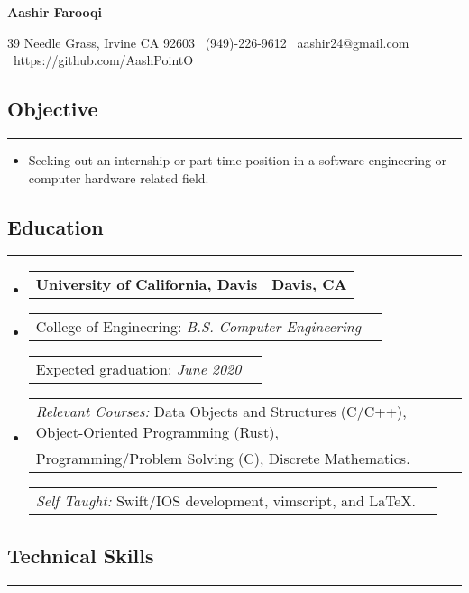 \documentclass[10pt,letterpaper]{article}
\makeatletter
\newcommand{\header}[2]
{
	\begin{tabular*}{\linewidth}{l@{\extracolsep{\fill}}r}
		#1 &
		#2 \\
	\end{tabular*}
}
\newcommand{\sectionbreak}
{
	\vspace{-1.2em}
	\rule{\textwidth}{1.7pt}
	\vspace{-1.7em}
}
\makeatother
\begin{document}
\begin{center}
{\LARGE \textbf{Aashir Farooqi}}

\vspace{0.5em}
39 Needle Grass, Irvine CA 92603 \textbar 
\ (949)-226-9612 \textbar 
\ aashir24@gmail.com \textbar
\ https://github.com/AashPointO 
\\
\end{center}
\vspace{-1.5em}

\subsection*{Objective}
\sectionbreak

\begin{itemize}
	\item[] Seeking out an internship or part-time position in a software engineering or computer hardware related field.

\end{itemize}

\vspace{-1.5em}

\subsection*{Education}
\sectionbreak

\begin{itemize}

\item[] 
	\header {\textbf{University of California, Davis}}
		{\textbf{Davis, CA}}
\item[]
	\header
		{College of Engineering: \emph{B.S. Computer Engineering}}
		{\emph{}}
	\header
		{Expected graduation: \emph{June 2020}}	
		{}
\item[]
	\header
	{\emph{Relevant Courses:} Data Objects and Structures (C/C++), Object-Oriented Programming (Rust), \\ \hspace{7.25em} Programming/Problem Solving (C), Discrete Mathematics.} 
		{}
	\header
	{\emph{Self Taught:} \hspace{2.0em} Swift/IOS development, vimscript, and \LaTeX.}
		{}
	
\end{itemize}

\vspace{-2.5em}

\subsection*{Technical Skills}
\sectionbreak
\end{document}
